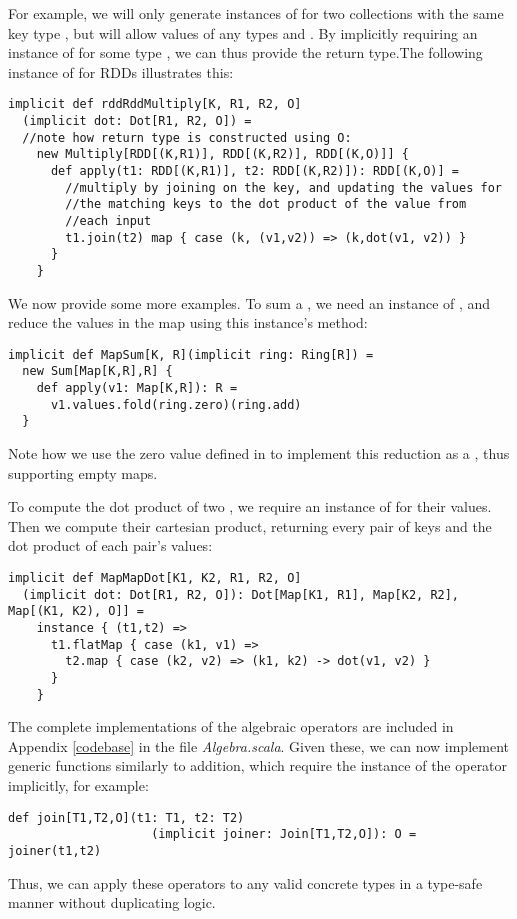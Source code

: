 For example, we will only generate instances of  for two collections with the same key type , but will allow values of any types  and . By implicitly requiring an instance of  for some type , we can thus provide the return type.The following instance of  for RDDs illustrates this:
\vs\begin{lstlisting}
implicit def rddRddMultiply[K, R1, R2, O]
  (implicit dot: Dot[R1, R2, O]) =
  //note how return type is constructed using O:
    new Multiply[RDD[(K,R1)], RDD[(K,R2)], RDD[(K,O)]] {
      def apply(t1: RDD[(K,R1)], t2: RDD[(K,R2)]): RDD[(K,O)] =
        //multiply by joining on the key, and updating the values for
        //the matching keys to the dot product of the value from
        //each input 
        t1.join(t2) map { case (k, (v1,v2)) => (k,dot(v1, v2)) }
      }
    }
\end{lstlisting}\vs
We now provide some more examples. To sum a , we need an instance of , and reduce the values in the map using this instance's  method:
\vs\begin{lstlisting}
implicit def MapSum[K, R](implicit ring: Ring[R]) =
  new Sum[Map[K,R],R] {
    def apply(v1: Map[K,R]): R =
      v1.values.fold(ring.zero)(ring.add)
  }
\end{lstlisting}\vs
Note how we use the zero value defined in  to implement this reduction as a , thus supporting empty maps.

To compute the dot product of two , we require an instance of  for their values. Then we compute their cartesian product, returning every pair of keys and the dot product of each pair's values:
\begin{lstlisting}
implicit def MapMapDot[K1, K2, R1, R2, O]
  (implicit dot: Dot[R1, R2, O]): Dot[Map[K1, R1], Map[K2, R2], Map[(K1, K2), O]] =
    instance { (t1,t2) =>
      t1.flatMap { case (k1, v1) =>
        t2.map { case (k2, v2) => (k1, k2) -> dot(v1, v2) }
      }
    }
\end{lstlisting}
The complete implementations of the algebraic operators are included in Appendix \ref{codebase} in the file \textit{Algebra.scala}. Given these, we can now implement generic functions similarly to addition, which require the instance of the operator implicitly, for example:
\vs\begin{lstlisting}
def join[T1,T2,O](t1: T1, t2: T2)
                    (implicit joiner: Join[T1,T2,O]): O = joiner(t1,t2)
\end{lstlisting}\vs
Thus, we can apply these operators to any valid concrete types in a type-safe manner without duplicating logic.

